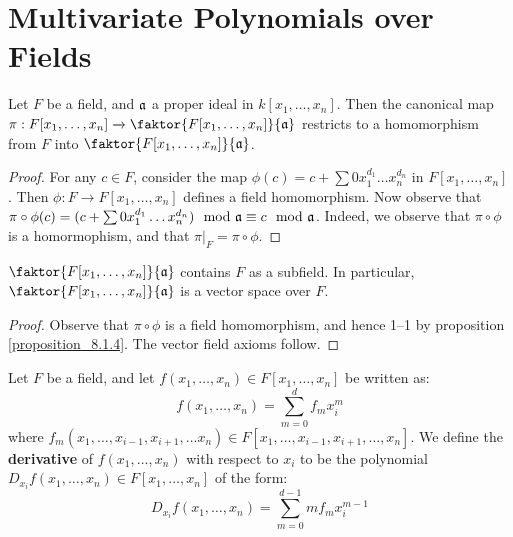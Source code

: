 \section{Multivariate Polynomials over Fields}

\begin{theorem}\label{theorem_8.8.1}
  Let $F$ be a field, and $\mathfrak{a}$ a proper ideal in $k[x_1, \dots,
  x_n]$. Then the canonical map $\pi:F[x_1, \dots, x_n] \xrightarrow{}
  \faktor{F[x_1, \dots, x_n]}{\af}$ restricts to a homomorphism from
  $F$ into $\faktor{F[x_1, \dots, x_n]}{\af}$.
\end{theorem}
\begin{proof}
  For any $c \in F$, consider the map $\phi(c)=c+\sum{0x_1^{d_1} \dots
  x_n^{d_n}}$ in $F[x_1, \dots, x_n]$. Then $\phi:F \xrightarrow{}
  F[x_1, \dots, x_n]$ defines a field homomorphism. Now observe that
  $\pi \circ \phi(c)=(c+\sum{0x_1^{d_1} \dots x_n^{d_n}}) \mod{\mathfrak{a}}
  \equiv c \mod{\mathfrak{a}}$. Indeed, we observe that $\pi \circ \phi$ is a
  homormophism, and that $\pi|_F=\pi \circ \phi$.
\end{proof}
\begin{corollary}
  $\faktor{F[x_1, \dots, x_n]}{\af}$ contains $F$ as a subfield. In
  particular, $\faktor{F[x_1, \dots, x_n]}{\af}$ is a vector space
  over $F$.
\end{corollary}
\begin{proof}
  Observe that $\pi \circ \phi$ is a field homomorphism, and hence
  1--1 by proposition \ref{proposition_8.1.4}. The vector field
  axioms follow.
\end{proof}

\begin{definition}
  Let $F$ be a field, and let $f(x_1, \dots ,x_n) \in F[x_1, \dots, x_n]$
  be written as:
  \begin{equation*}
    f(x_1, \dots, x_n)=\sum_{m=0}^d{f_mx_i^{m}}
  \end{equation*}
  where $f_m(x_1, \dots, x_{i-1},x_{i+1}, \dots x_n) \in F[x_1, \dots,
  x_{i-1},x_{i+1}, \dots, x_n]$. We define the \textbf{derivative} of
  $f(x_1, \dots, x_n)$ with respect to $x_i$ to be the polynomial
  $D_{x_i}{f(x_1, \dots, x_n)} \in F[x_1, \dots, x_n]$ of the form:
  \begin{equation*}
    D_{x_i}{f(x_1, \dots, x_n)}=\sum_{m=0}^{d-1}{mf_mx_i^{m-1}}
  \end{equation*}
\end{definition}

